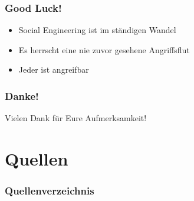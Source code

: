 \documentclass{beamer}
\begin{document}
\begin{frame}
    \frametitle{Good Luck!}
    \Large{
        \begin{itemize}
            \item Social Engineering ist im ständigen Wandel
            \item Es herrscht eine nie zuvor gesehene Angriffsflut
            \item Jeder ist angreifbar
        \end{itemize}
    }
\end{frame}

\begin{frame}
    \frametitle{Danke!}
    \begin{center}
        \LARGE{Vielen Dank für Eure Aufmerksamkeit!}
    \end{center}
\end{frame}

\section{Quellen}

\begin{frame}[allowframebreaks]
    \frametitle{Quellenverzeichnis}
    
    
\end{frame}
\end{document}
